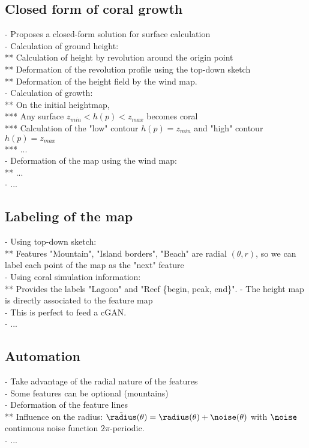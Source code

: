 \subsection{Closed form of coral growth}
- Proposes a closed-form solution for surface calculation \\
- Calculation of ground height: \\
** Calculation of height by revolution around the origin point \\
** Deformation of the revolution profile using the top-down sketch \\
** Deformation of the height field by the wind map. \\
- Calculation of growth: \\
** On the initial heightmap, \\
*** Any surface $z_{min} < h(p) < z_{max}$ becomes coral \\
*** Calculation of the "low" contour $h(p) = z_{min}$ and "high" contour $h(p) = z_{max}$ \\
*** ... \\
- Deformation of the map using the wind map: \\
** ... \\
- ...

\subsection{Labeling of the map}
- Using top-down sketch: \\
** Features "Mountain", "Island borders", "Beach" are radial $(\theta, r)$, so we can label each point of the map as the "next" feature \\
- Using coral simulation information: \\
** Provides the labels "Lagoon" and "Reef \{begin, peak, end\}".
- The height map is directly associated to the feature map \\
- This is perfect to feed a cGAN. \\
- ... 

\subsection{Automation}
- Take advantage of the radial nature of the features \\
- Some features can be optional (mountains) \\
- Deformation of the feature lines \\ 
** Influence on the radius: $\Tilde \radius(\theta) = \radius(\theta) + \noise(\theta)$ with $\noise$ continuous noise function $2\pi$-periodic. \\
- ...

